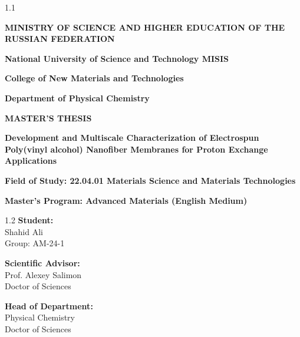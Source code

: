 \documentclass[12pt,a4paper]{report}
\begin{document}
\begin{titlepage}
    \centering
    \begin{spacing}{1.1}
        {\fontsize{14}{16}\selectfont \textbf{MINISTRY OF SCIENCE AND HIGHER EDUCATION OF THE RUSSIAN FEDERATION}\par}
        \vspace{0.5cm}
        {\fontsize{12}{14}\selectfont \textbf{National University of Science and Technology MISIS}\par}
        \vspace{0.2cm}
        {\fontsize{12}{14}\selectfont \textbf{College of New Materials and Technologies}\par}
        \vspace{0.2cm}
        {\fontsize{12}{14}\selectfont \textbf{Department of Physical Chemistry}\par}
    \end{spacing}

    \vspace{2.5cm}

    {\fontsize{14}{16}\selectfont \textbf{MASTER'S THESIS}\par}
    \vspace{0.5cm}
    {\fontsize{16}{20}\selectfont \textbf{ Development and Multiscale Characterization of Electrospun Poly(vinyl alcohol) Nanofiber Membranes for
Proton Exchange Applications}\par}
    
    \vspace{1cm}
    {\fontsize{12}{14}\selectfont \textbf{Field of Study: 22.04.01 Materials Science and Materials Technologies}\par}
    {\fontsize{12}{14}\selectfont \textbf{Master's Program: Advanced Materials (English Medium)}\par}

    \vspace{3cm}

    \begin{flushright}
        \begin{minipage}{0.5\textwidth}
            \begin{spacing}{1.2}
                \textbf{Student:}\\
                Shahid Ali\\
                Group: AM-24-1\par
                \vspace{0.8cm}
                \textbf{Scientific Advisor:}\\
                Prof. Alexey Salimon\\
                Doctor of Sciences\par
                \vspace{0.8cm}
                \textbf{Head of Department:}\\
                Physical Chemistry\\
                Doctor of Sciences
            \end{spacing}
        \end{minipage}
    \end{flushright}


\end{titlepage}
\end{document}
